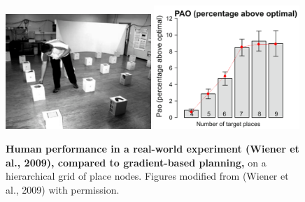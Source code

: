 \begin{figure}[!ht]
	\begin{center}
		\includegraphics[width=0.49\textwidth]{img/wienerexp}
		\includegraphics[width=0.49\textwidth]{img/wieneretal2009_spatial_tsp_comparison.png}
	\end{center}
	\caption[Human performance in a real-world experiment]{
		{\bf Human performance in a real-world experiment (Wiener et al., 2009), compared to gradient-based planning,} on a hierarchical grid of place nodes. Figures modified from (Wiener et al., 2009) with permission.
	}
	\label{tsp2}
\end{figure}


